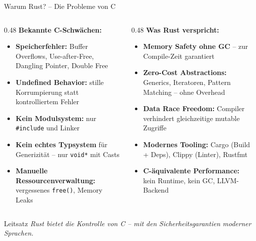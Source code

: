 \documentclass[%
  aspectratio=169,
  10pt
]{beamer}
\begin{document}
\begin{frame}{Warum Rust? -- Die Probleme von C}
  \begin{columns}[T]
    \begin{column}{0.48\textwidth}
      \small
      \textbf{Bekannte C-Schwächen:}
      \begin{itemize}
        \item \textbf{Speicherfehler:} Buffer Overflows, Use-after-Free,
              Dangling Pointer, Double Free
        \item \textbf{Undefined Behavior:} stille Korrumpierung
              statt kontrolliertem Fehler
        \item \textbf{Kein Modulsystem:} nur \texttt{\#include}
              und Linker
        \item \textbf{Kein echtes Typsystem} für Generizität --
              nur \texttt{void*} mit Casts
        \item \textbf{Manuelle Ressourcenverwaltung:}
              vergessenes \texttt{free()}, Memory Leaks
      \end{itemize}
    \end{column}
    \begin{column}{0.48\textwidth}
      \small
      \textbf{Was Rust verspricht:}
      \begin{itemize}
        \item \textbf{Memory Safety ohne GC} --
              zur Compile-Zeit garantiert
        \item \textbf{Zero-Cost Abstractions:} Generics,
              Iteratoren, Pattern Matching -- ohne Overhead
        \item \textbf{Data Race Freedom:} Compiler verhindert
              gleichzeitige mutable Zugriffe
        \item \textbf{Modernes Tooling:} Cargo (Build + Deps),
              Clippy (Linter), Rustfmt
        \item \textbf{C-äquivalente Performance:}
              kein Runtime, kein GC, LLVM-Backend
      \end{itemize}
    \end{column}
  \end{columns}
  \vspace{0.3em}
  \begin{alertblock}{Leitsatz}
    \emph{Rust bietet die Kontrolle von C -- mit den Sicherheitsgarantien moderner Sprachen.}
  \end{alertblock}
\end{frame}
\end{document}
